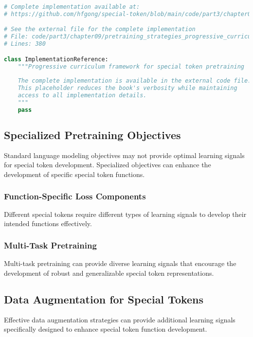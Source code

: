 \begin{lstlisting}[language=Python, caption={Progressive curriculum framework for special token pretraining}]
# Complete implementation available at:
# https://github.com/hfgong/special-token/blob/main/code/part3/chapter09/pretraining_strategies_progressive_curriculum_framewo.py

# See the external file for the complete implementation
# File: code/part3/chapter09/pretraining_strategies_progressive_curriculum_framewo.py
# Lines: 380

class ImplementationReference:
    """Progressive curriculum framework for special token pretraining
    
    The complete implementation is available in the external code file.
    This placeholder reduces the book's verbosity while maintaining
    access to all implementation details.
    """
    pass
\end{lstlisting}

\subsection{Specialized Pretraining Objectives}

Standard language modeling objectives may not provide optimal learning signals for special token development. Specialized objectives can enhance the development of specific special token functions.

\subsubsection{Function-Specific Loss Components}

Different special tokens require different types of learning signals to develop their intended functions effectively.

\subsubsection{Multi-Task Pretraining}

Multi-task pretraining can provide diverse learning signals that encourage the development of robust and generalizable special token representations.

\subsection{Data Augmentation for Special Tokens}

Effective data augmentation strategies can provide additional learning signals specifically designed to enhance special token function development.

